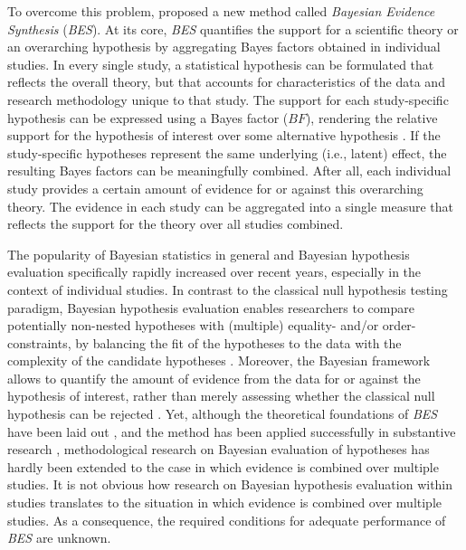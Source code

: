 \documentclass[
  authoryear,
  preprint,
  5p,
  twocolumn]{elsarticle}
\begin{document}
To overcome this problem, \citet{kuiper_combining_2013} proposed a new
method called \emph{Bayesian Evidence Synthesis} (\emph{BES}). At its
core, \emph{BES} quantifies the support for a scientific theory or an
overarching hypothesis by aggregating Bayes factors obtained in
individual studies. In every single study, a statistical hypothesis can
be formulated that reflects the overall theory, but that accounts for
characteristics of the data and research methodology unique to that
study. The support for each study-specific hypothesis can be expressed
using a Bayes factor (\(BF\)), rendering the relative support for the
hypothesis of interest over some alternative hypothesis
\citep{kass_raftery_bayes_factors_1995}. If the study-specific
hypotheses represent the same underlying (i.e., latent) effect, the
resulting Bayes factors can be meaningfully combined. After all, each
individual study provides a certain amount of evidence for or against
this overarching theory. The evidence in each study can be aggregated
into a single measure that reflects the support for the theory over all
studies combined.

The popularity of Bayesian statistics in general
\citep[e.g.,][]{lynch_bayesian_2019} and Bayesian hypothesis evaluation
specifically \citep{vandeschoot_systematic_2017} rapidly increased over
recent years, especially in the context of individual studies. In
contrast to the classical null hypothesis testing paradigm, Bayesian
hypothesis evaluation enables researchers to compare potentially
non-nested hypotheses with (multiple) equality- and/or
order-constraints, by balancing the fit of the hypotheses to the data
with the complexity of the candidate hypotheses
\citep{klugkist_inequality_2005, hoijtink2019tutorial}. Moreover, the
Bayesian framework allows to quantify the amount of evidence from the
data for or against the hypothesis of interest, rather than merely
assessing whether the classical null hypothesis can be rejected
\citep{Wagenmakers_bayesian_2018}. Yet, although the theoretical
foundations of \emph{BES} have been laid out
\citep{kuiper_combining_2013}, and the method has been applied
successfully in substantive research
\citep[e.g.,][]{kevenaar_bes_2021, zondervan_parental_2019, zondervan_robust_2020, volker_cooperation_2022},
methodological research on Bayesian evaluation of hypotheses has hardly
been extended to the case in which evidence is combined over multiple
studies. It is not obvious how research on Bayesian hypothesis
evaluation within studies translates to the situation in which evidence
is combined over multiple studies. As a consequence, the required
conditions for adequate performance of \emph{BES} are unknown.
\end{document}
